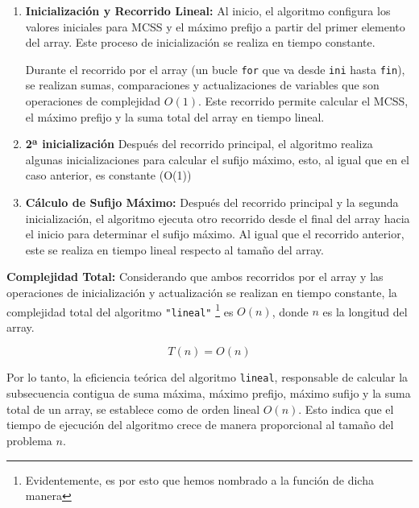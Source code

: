 \documentclass{article}
\begin{document}
\begin{enumerate}
 
    \item \textbf{Inicialización y Recorrido Lineal:} Al inicio, el algoritmo configura los valores iniciales para MCSS y el máximo prefijo a partir del primer elemento del array. Este proceso de inicialización se realiza en tiempo constante.
    
    
    
    Durante el recorrido por el array (un bucle \texttt{for} que va desde \texttt{ini} hasta \texttt{fin}), se realizan sumas, comparaciones y actualizaciones de variables que son operaciones de complejidad $O(1)$. Este recorrido permite calcular el MCSS, el máximo prefijo y la suma total del array en tiempo lineal.
    


    \item \textbf{2ª inicialización}
    Después del recorrido principal, el algoritmo realiza algunas inicializaciones para calcular el sufijo máximo, esto, al igual que en el caso anterior, es constante (O(1))
     
    
    \item \textbf{Cálculo de Sufijo Máximo:} Después del recorrido principal y la segunda inicialización, el algoritmo ejecuta otro recorrido desde el final del array hacia el inicio para determinar el sufijo máximo. Al igual que el recorrido anterior, este se realiza en tiempo lineal respecto al tamaño del array.
    
\end{enumerate}

\textbf{Complejidad Total:} Considerando que ambos recorridos por el array y las operaciones de inicialización y actualización se realizan en tiempo constante, la complejidad total del algoritmo \texttt{"lineal"} \footnote{Evidentemente, es por esto que hemos nombrado a la función de dicha manera} es $O(n)$, donde $n$ es la longitud del array. 

\begin{equation}
    T(n) = O(n)
\end{equation}

Por lo tanto, la eficiencia teórica del algoritmo \texttt{lineal}, responsable de calcular la subsecuencia contigua de suma máxima, máximo prefijo, máximo sufijo y la suma total de un array, se establece como de orden lineal $O(n)$. Esto indica que el tiempo de ejecución del algoritmo crece de manera proporcional al tamaño del problema $n$.
\end{document}
